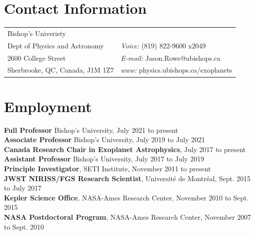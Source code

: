 \documentclass[margin,line]{res}
\begin{document}
\vspace*{-.5in}

\begin{resume}
\section{\sc Contact Information}
\vspace{.05in}
\begin{tabular}{@{}p{3in}p{4in}}
Bishop's Univeristy                    &  \\         
Dept of Physics and Astronomy    &   {\it Voice:}  (819) 822-9600 x2049  \\         
2600 College Street                    & {\it E-mail:}  Jason.Rowe@ubishops.ca\\
Sherbrooke, QC, Canada, J1M 1Z7        & {\it www:} physics.ubishops.ca/exoplanets \\
\end{tabular}

\vspace*{-.1in}

\section{\sc Employment}
{\bf Full Professor} Bishop's University, July 2021 to present \\
{\bf Associate Professor} Bishop's University, July 2019 to July 2021 \\
{\bf Canada Research Chair in Exoplanet Astrophysics}, July 2017 to present \\
{\bf Assistant Professor} Bishop's University, July 2017 to July 2019\\
{\bf Principle Investigator}, SETI Institute, November 2011 to present\\
{\bf JWST NIRISS/FGS Research Scientist}, Universit\'e de Montr\'eal, Sept. 2015 to July 2017\\
{\bf Kepler Science Office}, NASA-Ames Research Center, November 2010 to Sept. 2015\\
{\bf NASA Postdoctoral Program}, NASA-Ames Research Center, November 2007 to Sept. 2010%


\end{resume}
\end{document}
